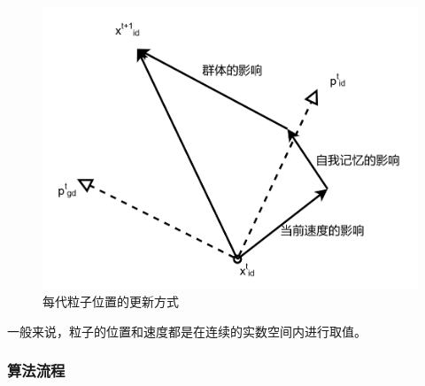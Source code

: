 \begin{figure}[ht]
	\centering
	\includegraphics[width=0.8\linewidth]{pic/Base_PSO}
	\caption{每代粒子位置的更新方式}

\end{figure}

一般来说，粒子的位置和速度都是在连续的实数空间内进行取值。



\subsubsection{算法流程}

